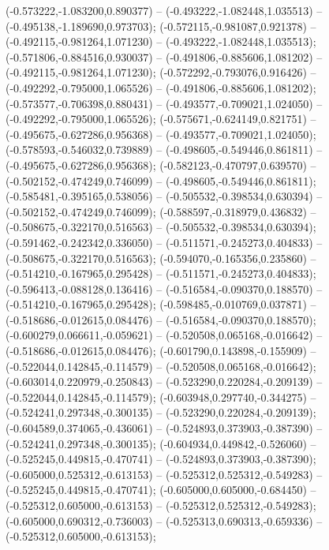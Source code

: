  (-0.573222,-1.083200,0.890377) -- (-0.493222,-1.082448,1.035513) -- (-0.495138,-1.189690,0.973703);
 (-0.572115,-0.981087,0.921378) -- (-0.492115,-0.981264,1.071230) -- (-0.493222,-1.082448,1.035513);
 (-0.571806,-0.884516,0.930037) -- (-0.491806,-0.885606,1.081202) -- (-0.492115,-0.981264,1.071230);
 (-0.572292,-0.793076,0.916426) -- (-0.492292,-0.795000,1.065526) -- (-0.491806,-0.885606,1.081202);
 (-0.573577,-0.706398,0.880431) -- (-0.493577,-0.709021,1.024050) -- (-0.492292,-0.795000,1.065526);
 (-0.575671,-0.624149,0.821751) -- (-0.495675,-0.627286,0.956368) -- (-0.493577,-0.709021,1.024050);
 (-0.578593,-0.546032,0.739889) -- (-0.498605,-0.549446,0.861811) -- (-0.495675,-0.627286,0.956368);
 (-0.582123,-0.470797,0.639570) -- (-0.502152,-0.474249,0.746099) -- (-0.498605,-0.549446,0.861811);
 (-0.585481,-0.395165,0.538056) -- (-0.505532,-0.398534,0.630394) -- (-0.502152,-0.474249,0.746099);
 (-0.588597,-0.318979,0.436832) -- (-0.508675,-0.322170,0.516563) -- (-0.505532,-0.398534,0.630394);
 (-0.591462,-0.242342,0.336050) -- (-0.511571,-0.245273,0.404833) -- (-0.508675,-0.322170,0.516563);
 (-0.594070,-0.165356,0.235860) -- (-0.514210,-0.167965,0.295428) -- (-0.511571,-0.245273,0.404833);
 (-0.596413,-0.088128,0.136416) -- (-0.516584,-0.090370,0.188570) -- (-0.514210,-0.167965,0.295428);
 (-0.598485,-0.010769,0.037871) -- (-0.518686,-0.012615,0.084476) -- (-0.516584,-0.090370,0.188570);
 (-0.600279,0.066611,-0.059621) -- (-0.520508,0.065168,-0.016642) -- (-0.518686,-0.012615,0.084476);
 (-0.601790,0.143898,-0.155909) -- (-0.522044,0.142845,-0.114579) -- (-0.520508,0.065168,-0.016642);
 (-0.603014,0.220979,-0.250843) -- (-0.523290,0.220284,-0.209139) -- (-0.522044,0.142845,-0.114579);
 (-0.603948,0.297740,-0.344275) -- (-0.524241,0.297348,-0.300135) -- (-0.523290,0.220284,-0.209139);
 (-0.604589,0.374065,-0.436061) -- (-0.524893,0.373903,-0.387390) -- (-0.524241,0.297348,-0.300135);
 (-0.604934,0.449842,-0.526060) -- (-0.525245,0.449815,-0.470741) -- (-0.524893,0.373903,-0.387390);
 (-0.605000,0.525312,-0.613153) -- (-0.525312,0.525312,-0.549283) -- (-0.525245,0.449815,-0.470741);
 (-0.605000,0.605000,-0.684450) -- (-0.525312,0.605000,-0.613153) -- (-0.525312,0.525312,-0.549283);
 (-0.605000,0.690312,-0.736003) -- (-0.525313,0.690313,-0.659336) -- (-0.525312,0.605000,-0.613153);
